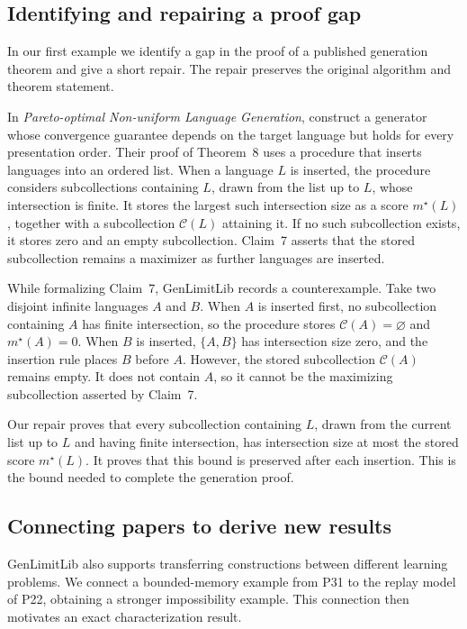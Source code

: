 \subsection{Identifying and repairing a proof gap}
\label{sec:precision}
In our first example we identify a gap in the proof of a published generation theorem and give a short repair. The repair preserves the original algorithm and theorem statement.

In \emph{Pareto-optimal Non-uniform Language Generation},
\citet[][P13]{charikar2026pareto} construct a generator whose convergence
guarantee depends on the target language but holds for every presentation
order. Their proof of Theorem~8 uses a procedure that inserts languages
into an ordered list. When a language $L$ is inserted, the procedure
considers subcollections containing $L$, drawn from the list up to $L$,
whose intersection is finite. It stores the largest such intersection
size as a score $m^\star(L)$, together with a subcollection
$\mathcal C(L)$ attaining it. If no such subcollection exists, it stores
zero and an empty subcollection. Claim~7 asserts that the stored
subcollection remains a maximizer as further languages are inserted.

While formalizing Claim~7, GenLimitLib records a counterexample. Take two disjoint infinite
languages $A$ and $B$. When $A$ is inserted first, no subcollection
containing $A$ has finite intersection, so the procedure stores
$\mathcal C(A)=\varnothing$ and $m^\star(A)=0$. When $B$ is inserted,
$\{A,B\}$ has intersection size zero, and the insertion rule places
$B$ before $A$. However, the stored subcollection $\mathcal C(A)$
remains empty. It does not contain $A$, so it cannot be the
maximizing subcollection asserted by Claim~7.

Our repair proves that every subcollection containing $L$, drawn from the current list up to $L$ and having finite intersection, has
intersection size at most the stored score $m^\star(L)$.
It proves that this bound is preserved after each insertion.
This is the bound needed to complete the generation proof.

\subsection{Connecting papers to derive new results}
\label{sec:connections}

GenLimitLib also supports transferring constructions between different learning
problems. We connect a bounded-memory example from P31 to the replay
model of P22, obtaining a stronger impossibility example. This connection
then motivates an exact characterization result.

